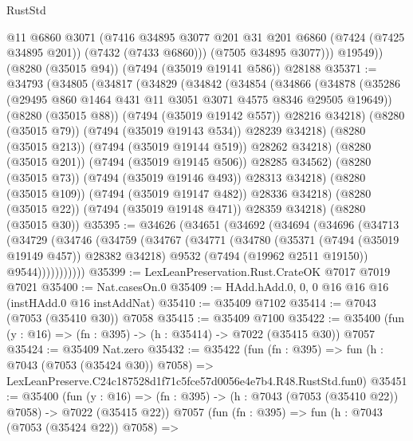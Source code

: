 \begin{lexlean}{RustStd}
\begin{coremodule}
            @11
            @6860
            @3071
            (@7416
              @34895
              @3077
              @201
              @31
              @201
              @6860
              (@7424 (@7425 @34895 @201))
              (@7432 (@7433 @6860)))
            (@7505 @34895 @3077)))
        @19549))
    (@8280 (@35015 @94))
    (@7494 (@35019 @19141 @586))
    @28188
@35371 := @34793
    (@34805
      (@34817
        (@34829
          (@34842
            (@34854
              (@34866
                (@34878
                  (@35286 (@29495 @860 @1464 @431 @11 @3051 @3071 @4575 @8346 @29505 @19649))
                  (@8280 (@35015 @88))
                  (@7494 (@35019 @19142 @557))
                  @28216
                  @34218)
                (@8280 (@35015 @79))
                (@7494 (@35019 @19143 @534))
                @28239
                @34218)
              (@8280 (@35015 @213))
              (@7494 (@35019 @19144 @519))
              @28262
              @34218)
            (@8280 (@35015 @201))
            (@7494 (@35019 @19145 @506))
            @28285
            @34562)
          (@8280 (@35015 @73))
          (@7494 (@35019 @19146 @493))
          @28313
          @34218)
        (@8280 (@35015 @109))
        (@7494 (@35019 @19147 @482))
        @28336
        @34218)
      (@8280 (@35015 @22))
      (@7494 (@35019 @19148 @471))
      @28359
      @34218)
    (@8280 (@35015 @30))
@35395 := @34626
    (@34651
      (@34692
        (@34694
          (@34696
            (@34713
              (@34729
                (@34746
                  (@34759
                    (@34767
                      (@34771
                        (@34780
                          (@35371 (@7494 (@35019 @19149 @457)) @28382 @34218)
                          @9532
                          (@7494 (@19962 @2511 @19150))
                          @9544)))))))))))
@35399 := LexLeanPreservation.Rust.CrateOK @7017 @7019 @7021
@35400 := Nat.casesOn.{0}
@35409 := HAdd.hAdd.{0, 0, 0} @16 @16 @16 (instHAdd.{0} @16 instAddNat)
@35410 := @35409 @7102
@35414 := @7043 (@7053 (@35410 @30)) @7058
@35415 := @35409 @7100
@35422 := @35400 (fun (y : @16) => (fn : @395) -> (h : @35414) -> @7022 (@35415 @30)) @7057
@35424 := @35409 Nat.zero
@35432 := @35422
    (fun (fn : @395) =>
    fun (h : @7043 (@7053 (@35424 @30)) @7058) =>
    LexLeanPreserve.C24c187528d1f71c5fce57d0056e4e7b4.R48.RustStd.fun0)
@35451 := @35400
    (fun (y : @16) => (fn : @395) -> (h : @7043 (@7053 (@35410 @22)) @7058) -> @7022 (@35415 @22))
    @7057
    (fun (fn : @395) =>
    fun (h : @7043 (@7053 (@35424 @22)) @7058) =>

\end{coremodule}
\end{lexlean}

